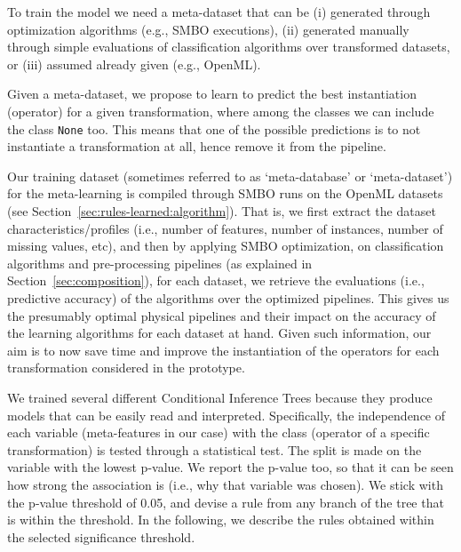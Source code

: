 To train the model we need a meta-dataset that can be  (i) generated through optimization algorithms (e.g., SMBO executions), (ii) generated manually through simple evaluations of classification algorithms over transformed datasets, or (iii) assumed already given (e.g., OpenML). 

Given a meta-dataset, we propose to learn to predict the best instantiation (operator) for a given transformation, where among the classes we can include the class \texttt{None} too. This means that one of the possible predictions is to not instantiate a transformation at all, hence remove it from the pipeline.

\begin{example}
Our training dataset (sometimes referred to as `meta-database' or `meta-dataset') for the meta-learning is compiled through SMBO runs on the OpenML datasets (see Section~\ref{sec:rules-learned:algorithm}). That is, we first extract the dataset characteristics/profiles (i.e., number of features, number of instances, number of missing values, etc), and then by applying SMBO optimization, on classification algorithms and pre-processing pipelines (as explained in Section~\ref{sec:composition}), for each dataset, we retrieve the evaluations (i.e., predictive accuracy) of the algorithms over the optimized pipelines. This gives us the presumably optimal physical pipelines and their impact on the accuracy of the learning algorithms for each dataset at hand. Given such information, our aim is to now save time and improve the instantiation of the operators for each transformation considered in the prototype. 

We trained several different Conditional Inference Trees \cite{ctree} because they produce models that can be easily read and interpreted.
Specifically, the independence of each variable (meta-features in our case) with the class (operator of a specific transformation) is tested through a statistical test. 
The split is made on the variable with the lowest p-value. 
We report the p-value too, so that it can be seen how strong the association is (i.e., why that variable was chosen).
We stick with the p-value threshold of 0.05, and devise a rule from any branch of the tree that is within the threshold. In the following, we describe the rules obtained within the selected significance threshold.


\end{example}
